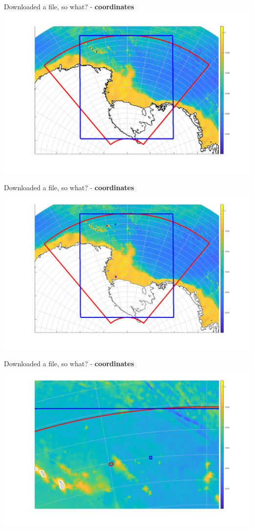 \begin{frame}{\insertsectionnumber{ |} Downloaded a file, so what? - \textbf{coordinates}}
    \includegraphics[scale=0.25]{images/winter_school_domain_1.png}
\end{frame}


\begin{frame}{\insertsectionnumber{ |} Downloaded a file, so what? - \textbf{coordinates}}
    \includegraphics[scale=0.25]{images/winter_school_domain_2.png}
\end{frame}


\begin{frame}{\insertsectionnumber{ |} Downloaded a file, so what? - \textbf{coordinates}}
    \includegraphics[scale=0.25]{images/winter_school_domain_3.png}
\end{frame}

